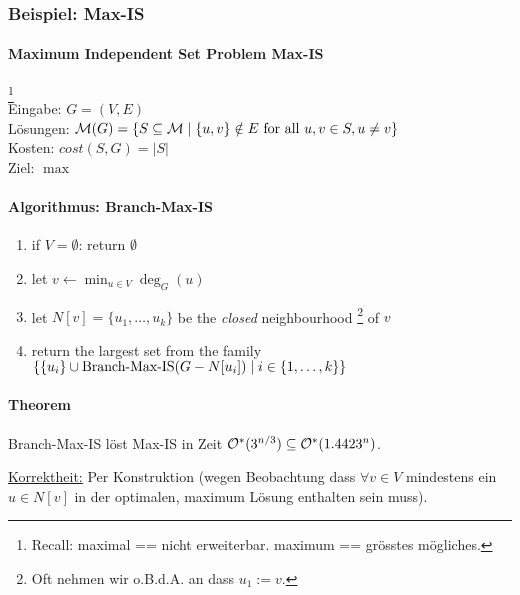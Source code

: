 \subsubsection{Beispiel: Max-IS}

\paragraph{Maximum Independent Set Problem Max-IS}
\footnote{Recall: maximal == nicht erweiterbar. maximum == grösstes mögliches.} \\
Eingabe: $G=(V,E)$ \\
Lösungen: $\mathcal{M}(G) = \{ S \subseteq \mathcal{M} \; | \; \{ u,v \} \notin E \text{ for all } u,v \in S, u \neq v \}$ \\
Kosten: $cost(S, G) = |S|$ \\
Ziel: $\max$

\paragraph{Algorithmus: Branch-Max-IS}
\begin{enumerate}
    \item if $V = \emptyset$: return $\emptyset$
    \item let $v \leftarrow \min_{u \in V} \deg_G(u)$
    \item let $N[v] = \{ u_1, \dots, u_k \}$ be the \emph{closed} neighbourhood%
    \footnote{Oft nehmen wir o.B.d.A. an dass $u_1 := v$.} of $v$
    \item return the largest set from the family $\{ \{u_i\} \cup \text{Branch-Max-IS}(G-N[u_i]) \; | \; i \in \{1,\dots,k\} \}$
\end{enumerate}

\paragraph{Theorem}
Branch-Max-IS löst Max-IS in Zeit $\mathcal{O}^* (3^{n/3})  \subseteq \mathcal{O}^* (1.4423^n)$.

\underline{Korrektheit:} Per Konstruktion (wegen Beobachtung dass $\forall v \in V$ mindestens ein $u \in N[v]$ in der optimalen, maximum Lösung enthalten sein muss).

